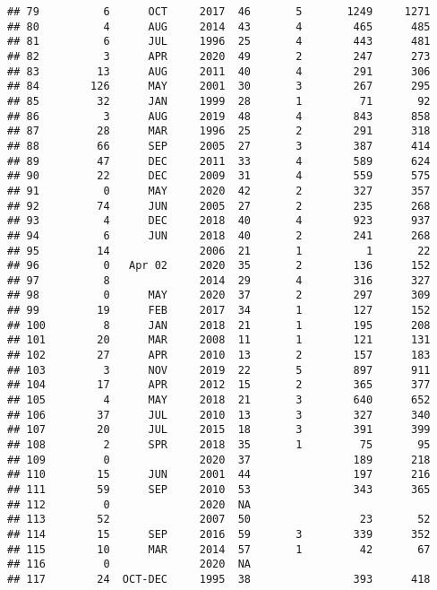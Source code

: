 \documentclass[
  english,
  man]{apa6}
\begin{document}
\begin{verbatim}
## 79          6      OCT     2017  46       5       1249     1271
## 80          4      AUG     2014  43       4        465      485
## 81          6      JUL     1996  25       4        443      481
## 82          3      APR     2020  49       2        247      273
## 83         13      AUG     2011  40       4        291      306
## 84        126      MAY     2001  30       3        267      295
## 85         32      JAN     1999  28       1         71       92
## 86          3      AUG     2019  48       4        843      858
## 87         28      MAR     1996  25       2        291      318
## 88         66      SEP     2005  27       3        387      414
## 89         47      DEC     2011  33       4        589      624
## 90         22      DEC     2009  31       4        559      575
## 91          0      MAY     2020  42       2        327      357
## 92         74      JUN     2005  27       2        235      268
## 93          4      DEC     2018  40       4        923      937
## 94          6      JUN     2018  40       2        241      268
## 95         14              2006  21       1          1       22
## 96          0   Apr 02     2020  35       2        136      152
## 97          8              2014  29       4        316      327
## 98          0      MAY     2020  37       2        297      309
## 99         19      FEB     2017  34       1        127      152
## 100         8      JAN     2018  21       1        195      208
## 101        20      MAR     2008  11       1        121      131
## 102        27      APR     2010  13       2        157      183
## 103         3      NOV     2019  22       5        897      911
## 104        17      APR     2012  15       2        365      377
## 105         4      MAY     2018  21       3        640      652
## 106        37      JUL     2010  13       3        327      340
## 107        20      JUL     2015  18       3        391      399
## 108         2      SPR     2018  35       1         75       95
## 109         0              2020  37                189      218
## 110        15      JUN     2001  44                197      216
## 111        59      SEP     2010  53                343      365
## 112         0              2020  NA                            
## 113        52              2007  50                 23       52
## 114        15      SEP     2016  59       3        339      352
## 115        10      MAR     2014  57       1         42       67
## 116         0              2020  NA                            
## 117        24  OCT-DEC     1995  38                393      418

\end{verbatim}
\end{document}
